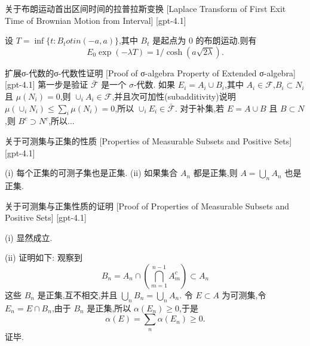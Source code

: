 \documentclass[UTF8]{ctexart}
\begin{document}
    
    
    \begin{thm}
        {关于布朗运动首出区间时间的拉普拉斯变换}
        [Laplace Transform of First Exit Time of Brownian Motion from Interval]
        [gpt-4.1]
        
设 $T = \operatorname*{inf} \{ t : B_{t} 
otin (-a, a) \}$,其中 $B_t$ 是起点为 $0$ 的布朗运动.则有
\[
E_{0} \exp ( -\lambda T ) = 1 / \cosh ( a \sqrt{2\lambda} ).
\]

    \end{thm}
    
    
    
    \begin{prf}
        {扩展σ-代数的σ-代数性证明}
        [Proof of σ-algebra Property of Extended σ-algebra]
        [gpt-4.1]
        第一步是验证 $\bar{\mathcal{F}}$ 是一个 $\sigma$-代数.
如果 $E_i = A_i \cup B_i$,其中 $A_i \in \mathcal{F}$,$B_i \subset N_i$ 且 $\mu(N_i) = 0$,则 $\cup_i A_i \in \mathcal{F}$,并且次可加性(subadditivity)说明 $\mu(\cup_i N_i) \leq \sum_i \mu(N_i) = 0$,所以 $\cup_i E_i \in \bar{\mathcal{F}}$.
对于补集,若 $E = A \cup B$ 且 $B \subset N$,则 $B^c \supset N^c$,所以...
    \end{prf}
    
    
    
    \begin{lma}
        {关于可测集与正集的性质}
        [Properties of Measurable Subsets and Positive Sets]
        [gpt-4.1]
        
(i) 每个正集的可测子集也是正集.
(ii) 如果集合 $A_n$ 都是正集,则 $A = \bigcup_n A_n$ 也是正集.

    \end{lma}
    
    
    
    \begin{prf}
        {关于可测集与正集性质的证明}
        [Proof of Properties of Measurable Subsets and Positive Sets]
        [gpt-4.1]
        
(i) 显然成立.

(ii) 证明如下:
观察到
\[
B_n = A_n \cap \left( \bigcap_{m=1}^{n-1} A_m^c \right) \subset A_n
\]
这些 $B_n$ 是正集,互不相交,并且 $\bigcup_n B_n = \bigcup_n A_n$.
令 $E \subset A$ 为可测集,令 $E_n = E \cap B_n$,由于 $B_n$ 是正集,所以 $\alpha(E_n) \geq 0$,于是
\[
\alpha(E) = \sum_n \alpha(E_n) \ge 0.
\]
证毕.

    \end{prf}
    
\end{document}
